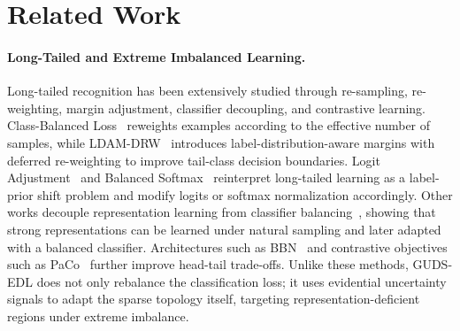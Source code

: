 \documentclass[letterpaper]{article} %
\begin{document}
\section{Related Work}\label{sec:related}

\paragraph{Long-Tailed and Extreme Imbalanced Learning.} Long-tailed recognition has been extensively studied through re-sampling, re-weighting, margin adjustment, classifier decoupling, and contrastive learning. Class-Balanced Loss~\cite{cui2019class} reweights examples according to the effective number of samples, while LDAM-DRW~\cite{cao2019learning} introduces label-distribution-aware margins with deferred re-weighting to improve tail-class decision boundaries. Logit Adjustment~\cite{menon2021long} and Balanced Softmax~\cite{ren2020balanced} reinterpret long-tailed learning as a label-prior shift problem and modify logits or softmax normalization accordingly. Other works decouple representation learning from classifier balancing~\cite{kang2019decoupling}, showing that strong representations can be learned under natural sampling and later adapted with a balanced classifier. Architectures such as BBN~\cite{zhou2020bbn} and contrastive objectives such as PaCo~\cite{cui2021parametric} further improve head-tail trade-offs. Unlike these methods, GUDS-EDL does not only rebalance the classification loss; it uses evidential uncertainty signals to adapt the sparse topology itself, targeting representation-deficient regions under extreme imbalance.
\end{document}

